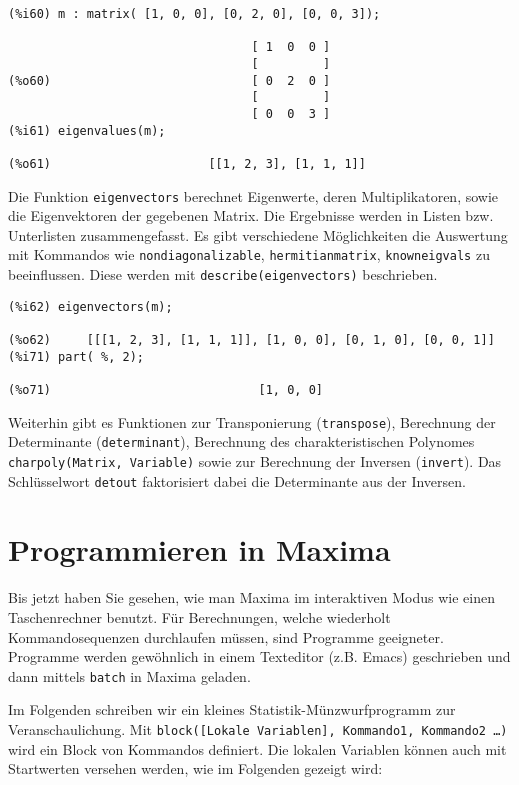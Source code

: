\documentclass[12pt]{scrartcl}
\begin{document}
\begin{verbatim}
(%i60) m : matrix( [1, 0, 0], [0, 2, 0], [0, 0, 3]);

                                  [ 1  0  0 ]
                                  [         ]
(%o60)                            [ 0  2  0 ]
                                  [         ]
                                  [ 0  0  3 ]
(%i61) eigenvalues(m);

(%o61)                      [[1, 2, 3], [1, 1, 1]]
\end{verbatim}

Die Funktion \texttt{eigenvectors} berechnet Eigenwerte, deren
Multiplikatoren, sowie die Eigenvektoren der gegebenen Matrix. Die
Ergebnisse werden in Listen bzw. Unterlisten zusammengefasst. Es gibt
verschiedene Möglichkeiten die Auswertung mit Kommandos wie
\texttt{nondiagonalizable}, \texttt{hermitianmatrix},
\texttt{knowneigvals} zu beeinflussen. Diese werden mit
\texttt{describe(eigenvectors)} beschrieben.

\begin{verbatim}
(%i62) eigenvectors(m);

(%o62)     [[[1, 2, 3], [1, 1, 1]], [1, 0, 0], [0, 1, 0], [0, 0, 1]]
(%i71) part( %, 2);

(%o71)                             [1, 0, 0]
\end{verbatim}

Weiterhin gibt es Funktionen zur Transponierung (\texttt{transpose}),
Berechnung der Determinante (\texttt{determinant}), Berechnung  des
charakteristischen Polynomes \texttt{charpoly(Matrix, Variable)} sowie
zur Berechnung der Inversen (\texttt{invert}). Das  Schlüsselwort
\texttt{detout} faktorisiert  dabei die Determinante aus der Inversen.

\section{Programmieren in Maxima}

Bis jetzt haben Sie gesehen, wie man Maxima im interaktiven Modus wie
einen Taschenrechner benutzt. Für Berechnungen, welche wiederholt
Kommandosequenzen durchlaufen müssen, sind Programme geeigneter.
Programme werden gewöhnlich in einem Texteditor (z.B. Emacs) geschrieben
und dann mittels \texttt{batch}  in Maxima geladen.

Im Folgenden schreiben wir ein kleines Statistik-Münzwurfprogramm zur
Veranschaulichung. Mit \texttt{block([Lokale Variablen], Kommando1,  Kommando2 \ldots)} wird
ein Block von Kommandos  definiert. Die lokalen Variablen können auch
mit Startwerten versehen werden, wie im Folgenden gezeigt wird:
\end{document}
